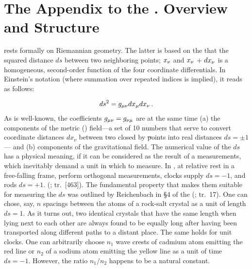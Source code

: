 \documentclass[submitted]{article}
\newcommand{\xadx}{$\xn$ and $\xn$ + $d\xn$\xspace}
\newcommand{\PRZL}{\citetitle{Reichenbach1928}\xspace}
\renewcommand{\rzlp}[2]{(\cite[#1]{Reichenbach1928}; tr.\ #2)\xspace}
\renewcommand{\rzlap}[2]{(\cite[#1]{Reichenbach1928}; tr.\ [#2])\xspace}
\begin{document}
\section{The Appendix to the \PRZL. Overview and Structure}
\label{overview}

\Gr rests formally on Riemannian geometry. The latter is based on the  that the squared distance $ds$ between two neighboring points; \xadx is a homogeneous, second-order function of the four coordinate differentials. In Einstein's notation (where summation over repeated indices is implied), it reads as follows:

\begin{equation}\label{eq:lineelement}
ds^2=g_{\mu\nu} dx_\mu dx_\nu\,.
\end{equation}
%
As is well-known, the coefficients $g_{\mu\nu}=g_{\nu\mu}$ are at the same time (a) the components of the metric () field---a set of 10 numbers that serve to convert coordinate distances $dx_\nu$ between two closed by \st points into real distances $ds=\pm 1$--- and (b) components of the gravitational field. The numerical value of the $ds$ has a physical meaning, if it can be considered as the result of a measurements, which inevitably demand a unit in which to measure. In \rt, \rac at relative rest in a free-falling frame, perform orthogonal measurements, clocks supply $d s=-1$, and rods $d s=+1$.  \rzlap{331}{463}. The fundamental property that makes them suitable for measuring the $ds$ was outlined by Reichenbach in \S4 of the \PRZL \rzlp{26--27}{17}. One can chose, say, $n$ spacings between the atoms of a rock-salt crystal as a unit of length $ds=1$. As it turns out, two identical crystals that have the same length when lying next to each other are always found to be equally long after having been transported along different paths to a distant place. The same holds for unit clocks. One can arbitrarily choose $n_1$ wave crests of cadmium atom emitting the red line or $n_2$ of a sodium atom emitting the yellow line as a unit of time $ds=-1$. However, the ratio $n_1/n_2$ happens to be a natural constant.
\end{document}

